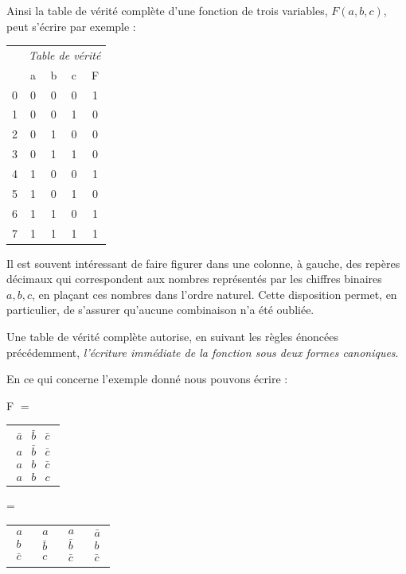 Ainsi la table de vérité complète d'une fonction de trois variables,
$F(a,b,c)$, peut s'écrire par exemple :

\begin{center}
\begin{tabular}{r|c|c|c||c|}
\multicolumn{1}{c}{} & \multicolumn{4}{c}{\textit{Table de vérité}}\tabularnewline
\cline{2-5} 
 & a  & b  & c  & F \tabularnewline
\cline{2-5} 
0  & 0  & 0  & 0  & 1 \tabularnewline
1  & 0  & 0  & 1  & 0 \tabularnewline
2  & 0  & 1  & 0  & 0 \tabularnewline
3  & 0  & 1  & 1  & 0 \tabularnewline
4  & 1  & 0  & 0  & 1 \tabularnewline
5  & 1  & 0  & 1  & 0 \tabularnewline
6  & 1  & 1  & 0  & 1 \tabularnewline
7  & 1  & 1  & 1  & 1 \tabularnewline
\cline{2-5} 
\end{tabular}\medskip
\end{center}

Il est souvent intéressant de faire figurer dans une colonne, à gauche,
des repères décimaux qui correspondent aux nombres représentés par
les chiffres binaires $a,b,c$, en plaçant ces nombres dans l'ordre
naturel. Cette disposition permet, en particulier, de s'assurer qu'aucune
combinaison n'a été oubliée.

Une table de vérité complète autorise, en suivant les règles énoncées
précédemment, \emph{l'écriture immédiate de la fonction sous deux
formes canoniques}. 

En ce qui concerne l'exemple donné nous pouvons écrire :

\begin{center}
F $=$ %
\begin{tabular}{|c|}
$\begin{array}{ccc}
\bar{a} & \bar{b} & \bar{c}\\
a & \bar{b} & \bar{c}\\
a & b & \bar{c}\\
a & b & c
\end{array}$\tabularnewline
\end{tabular}= %
\begin{tabular}{|c|c|c|c|}
$\begin{array}{c}
a\\
b\\
\bar{c}
\end{array}$ & $\begin{array}{c}
a\\
\bar{b}\\
c
\end{array}$ & $\begin{array}{c}
a\\
\bar{b}\\
\bar{c}
\end{array}$ & $\begin{array}{c}
\bar{a}\\
b\\
\bar{c}
\end{array}$\tabularnewline
\end{tabular}
\end{center}

